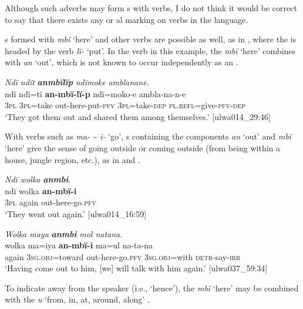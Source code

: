 Although such adverbs may form s with verbs, I do not think it would be correct to say that there exists any  or al  marking on verbs in the language.

  s formed with \textit{mbï} ‘here’ and other verbs are possible as well, as in , where the  is headed by the verb \textit{lï-} ‘put’. In the verb in this example, the  \textit{mbï} ‘here’ combines with \textit{an} ‘out’, which is not known to occur independently as an .

\ea%
    \label{ex:otherwc:85}
          \textit{Ndï ndït} \textbf{\textit{anmbïlïp}} \textit{ndïmoke amblanane.}\\
\gll    ndï  ndï=tï    \textbf{an-mbï-lï-p}    ndï=moko-e ambla-na-n-e\\
    3\textsc{pl}  3\textsc{pl}=take  out-here-put-\textsc{pfv}  3\textsc{pl}=take-\textsc{dep}    \textsc{pl.refl}=give-\textsc{pfv-dep}\\
\glt `They got them out and shared them among themselves.’ [ulwa014\_29:46]
\z

With  verbs such as \textit{ma-} {\textasciitilde} \textit{i-} ‘go’, s containing the components \textit{an} ‘out’ and \textit{mbï} ‘here’ give the sense of going outside or coming outside (from being within a house, jungle region, etc.), as in  and .

\ea%
    \label{ex:otherwc:86}
          \textit{Ndï wolka} \textbf{\textit{anmbi}}.\\
\gll ndï  wolka  \textbf{an-mbï-i}\\
    3\textsc{pl}  again  out-here-go.\textsc{pfv}\\
\glt `They went out again.’ [ulwa014\_16:59]
\z

\ea%
    \label{ex:otherwc:87}
          \textit{Wolka maya} \textbf{\textit{anmbi}} \textit{mol natana.}\\
\gll    wolka  ma=iya      \textbf{an-mbï-i}      ma=ul na-ta-na\\
    again  3\textsc{sg.obj}=toward  out-here-go.\textsc{pfv}  3\textsc{sg.obj}=with    \textsc{detr-}say-\textsc{irr}\\
\glt `Having come out to him, [we] will talk with him again.’ [ulwa037\_59:34]\\
\z

To indicate  away from the speaker (i.e., ‘hence’), the  \textit{mbï} ‘here’ may be combined with the  \textit{u} ‘from, in, at, around, along’ .

